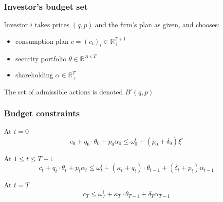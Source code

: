 \documentclass[blue]{beamer}
\def\R{\mathbb{R}}
\def\leq{\leqslant}
\theoremstyle{definition}
\theoremstyle{example}
\begin{document}
\begin{frame}\frametitle{Investor's budget set}
Investor $i$ takes prices $(q, p)$ and the firm's plan as given, and chooses:
\begin{itemize}
\item consumption plan $c = (c_t)_t \in \R_+^{T+1}$
\item security portfolio $\theta \in \R^{A \times T}$
\item shareholding $\alpha \in \R_+^T$
\end{itemize}
\bigskip

The set of admissible actions is denoted $B^i(q, p)$
\end{frame}

\begin{frame}\frametitle{Budget constraints}
\begin{block}{At $t = 0$}
\begin{equation*}
c_0 + q_0 \cdot \theta_0 + p_0 \alpha_0 \leq \omega^i_0 + (p_0 + \delta_0) \xi^i
\end{equation*}
\end{block}

\begin{block}{At $1 \leq t \leq T-1$}
\begin{equation*}
c_t + q_t \cdot \theta_t + p_t \alpha_t \leq \omega^i_t + (\kappa_t + q_t) \cdot \theta_{t-1} + (\delta_t + p_t) \alpha_{t-1}
\end{equation*}
\end{block}

\begin{block}{At $t = T$}
\begin{equation*}
c_T \leq \omega^i_T + \kappa_T \cdot \theta_{T-1} + \delta_T \alpha_{T-1}
\end{equation*}
\end{block}
\end{frame}
\end{document}
